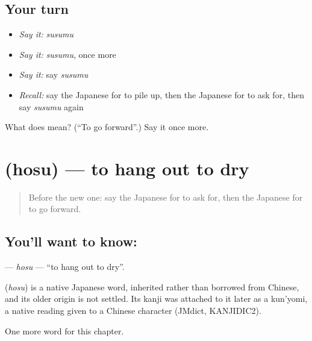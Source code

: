 \subsection*{Your turn}
\begin{itemize}
\raggedright
  \item \emph{Say it:} \emph{susumu}
  \item \emph{Say it:} \emph{susumu}, once more
  \item \emph{Say it:} say \emph{susumu}
  \item \emph{Recall:} say the Japanese for to pile up, then the Japanese for to ask for, then say \emph{susumu} again
\end{itemize}

\begin{tcolorbox}[breakable,colback=teal!4,colframe=teal!35!black,title={Before you move on}]
What does  mean? (\textquotedblleft{}To go forward\textquotedblright{}.) Say it once more.
\end{tcolorbox}
\section[\texorpdfstring{\ja{ほす} (hosu)}{ほす (hosu)}]{ (hosu) — to hang out to dry}

\label{lesson:JA-C87-hosu}



\begin{quote}
Before the new one: say the Japanese for to ask for, then the Japanese for to go forward.
\end{quote}

\subsection*{You'll want to know: }
\textbf{} — \emph{hosu} — \textquotedblleft{}to hang out to dry\textquotedblright{}.

\begin{cousinweb}
\textbf{} (\emph{hosu}) is a native Japanese word, inherited rather than borrowed from Chinese, and its older origin is not settled. Its kanji was attached to it later as a kun'yomi, a native reading given to a Chinese character (JMdict, KANJIDIC2).
\end{cousinweb}

\begin{grammarlens}[title={What you've built}]
One more word for this chapter.
\end{grammarlens}

